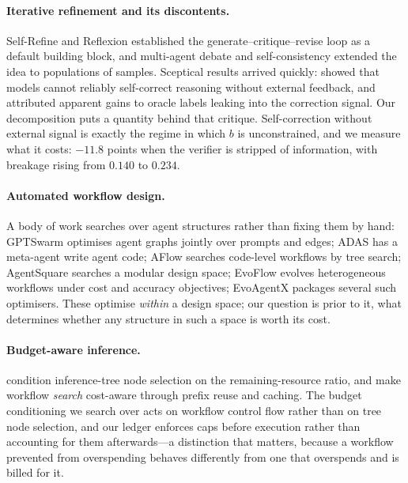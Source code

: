\documentclass{article}
\newcommand{\brate}{b}
\begin{document}
\paragraph{Iterative refinement and its discontents.} Self-Refine
\citep{madaan2023selfrefine} and Reflexion \citep{shinn2023reflexion}
established the generate--critique--revise loop as a default building block, and
multi-agent debate \citep{du2024debate} and self-consistency
\citep{wang2023selfconsistency} extended the idea to populations of samples.
Sceptical results arrived quickly: \citet{huang2024selfcorrect} showed that
models cannot reliably self-correct reasoning without external feedback, and
attributed apparent gains to oracle labels leaking into the correction signal.
Our decomposition puts a quantity behind that critique. Self-correction without
external signal is exactly the regime in which $\brate$ is unconstrained, and we
measure what it costs: $-11.8$ points when the verifier is stripped of
information, with breakage rising from $0.140$ to $0.234$.

\paragraph{Automated workflow design.} A body of work searches over agent
structures rather than fixing them by hand: GPTSwarm \citep{zhuge2024gptswarm}
optimises agent graphs jointly over prompts and edges; ADAS \citep{hu2024adas}
has a meta-agent write agent code; AFlow \citep{zhang2025aflow} searches
code-level workflows by tree search; AgentSquare \citep{shang2024agentsquare}
searches a modular design space; EvoFlow \citep{zhang2025evoflow} evolves
heterogeneous workflows under cost and accuracy objectives; EvoAgentX
\citep{wang2025evoagentx} packages several such optimisers. These optimise
\emph{within} a design space; our question is prior to it, what determines
whether any structure in such a space is worth its cost.

\paragraph{Budget-aware inference.} \citet{li2026bavt} condition inference-tree
node selection on the remaining-resource ratio, and \citet{agentuct2026} make
workflow \emph{search} cost-aware through prefix reuse and caching. The budget
conditioning we search over acts on workflow control flow rather than on tree
node selection, and our ledger enforces caps before execution rather than
accounting for them afterwards---a distinction that matters, because a workflow
prevented from overspending behaves differently from one that overspends and is
billed for it.
\end{document}
